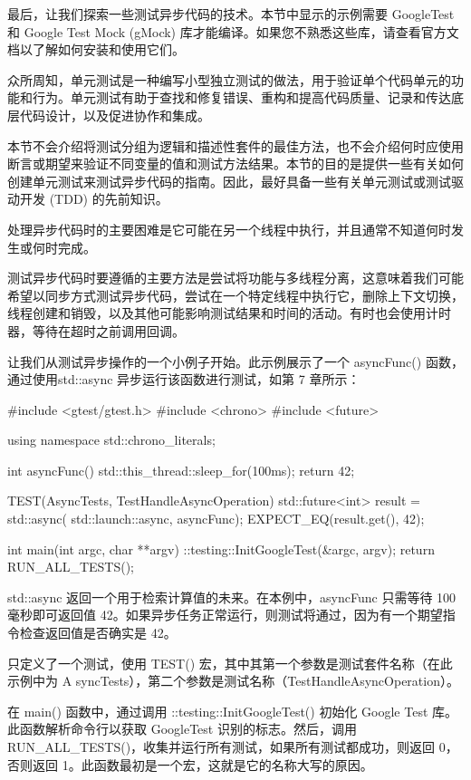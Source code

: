 
最后，让我们探索一些测试异步代码的技术。本节中显示的示例需要 GoogleTest 和 Google Test Mock (gMock) 库才能编译。如果您不熟悉这些库，请查看官方文档以了解如何安装和使用它们。

众所周知，单元测试是一种编写小型独立测试的做法，用于验证单个代码单元的功能和行为。单元测试有助于查找和修复错误、重构和提高代码质量、记录和传达底层代码设计，以及促进协作和集成。

本节不会介绍将测试分组为逻辑和描述性套件的最佳方法，也不会介绍何时应使用断言或期望来验证不同变量的值和测试方法结果。本节的目的是提供一些有关如何创建单元测试来测试异步代码的指南。因此，最好具备一些有关单元测试或测试驱动开发 (TDD) 的先前知识。

处理异步代码时的主要困难是它可能在另一个线程中执行，并且通常不知道何时发生或何时完成。

测试异步代码时要遵循的主要方法是尝试将功能与多线程分离，这意味着我们可能希望以同步方式测试异步代码，尝试在一个特定线程中执行它，删除上下文切换，线程创建和销毁，以及其他可能影响测试结果和时间的活动。有时也会使用计时器，等待在超时之前调用回调。


让我们从测试异步操作的一个小例子开始。此示例展示了一个 asyncFunc() 函数，通过使用std::async 异步运行该函数进行测试，如第 7 章所示：

\begin{cpp}
#include <gtest/gtest.h>
#include <chrono>
#include <future>

using namespace std::chrono_literals;

int asyncFunc() {
    std::this_thread::sleep_for(100ms);
    return 42;
}

TEST(AsyncTests, TestHandleAsyncOperation) {
    std::future<int> result = std::async(
                            std::launch::async,
                            asyncFunc);
    EXPECT_EQ(result.get(), 42);
}


int main(int argc, char **argv) {
    ::testing::InitGoogleTest(&argc, argv);
    return RUN_ALL_TESTS();
}
\end{cpp}

std::async 返回一个用于检索计算值的未来。在本例中，asyncFunc 只需等待 100 毫秒即可返回值 42。如果异步任务正常运行，则测试将通过，因为有一个期望指令检查返回值是否确实是 42。

只定义了一个测试，使用 TEST() 宏，其中其第一个参数是测试套件名称（在此示例中为 A syncTests），第二个参数是测试名称（TestHandleAsyncOperation）。

在 main() 函数中，通过调用 ::testing::InitGoogleTest() 初始化 Google Test 库。此函数解析命令行以获取 GoogleTest 识别的标志。然后，调用 RUN\_ALL\_TESTS()，收集并运行所有测试，如果所有测试都成功，则返回 0，否则返回 1。此函数最初是一个宏，这就是它的名称大写的原因。

